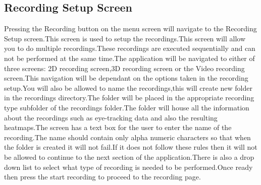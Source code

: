 \subsection{Recording Setup Screen}
Pressing the Recording button on the menu screen will navigate to the Recording Setup screen.This screen is used to setup the recordings.This screen will allow you to do multiple recordings.These recordings are executed sequentially and can not be performed at the same time.The application will be navigated to either of three screens: 2D recording screen,3D recording screen or the Video recording screen.This navigation will be dependant on the options taken in the recording setup.You will also be allowed to name the recordings,this will create new folder in the recordings directory.The folder will be placed in the appropriate recording type subfolder of the recordings folder.The folder will house all the information about the recordings such as eye-tracking data and also the resulting heatmaps.The screen has a text box for the user to enter the name of the recording.The name should contain only alpha numeric characters so that when the folder is created it will not fail.If it does not follow these rules then it will not be allowed to continue to the next section of the application.There is also a drop down list to select what type of recording is needed to be performed.Once ready then press the start recording to proceed to the recording page.

